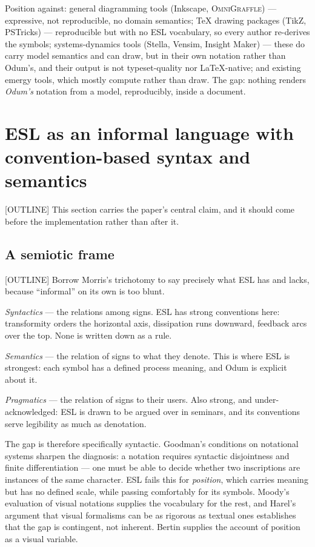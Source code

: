 Position against: general diagramming tools (Inkscape,
\textsc{OmniGraffle}) --- expressive, not reproducible, no domain semantics;
\TeX{} drawing packages (TikZ, PSTricks) --- reproducible but with no ESL
vocabulary, so every author re-derives the symbols; systems-dynamics tools
(Stella, Vensim, Insight Maker) --- these do carry model semantics and can draw,
but in their own notation rather than Odum's, and their output is not
typeset-quality nor \LaTeX-native; and existing emergy tools, which mostly
compute rather than draw. The gap: nothing renders \emph{Odum's} notation from a
model, reproducibly, inside a document.

\section{ESL as an informal language with convention-based syntax and semantics}
\label{sec:informal}

[OUTLINE] This section carries the paper's central claim, and it should come
before the implementation rather than after it.

\subsection{A semiotic frame}
\label{sec:semiotics}

[OUTLINE] Borrow Morris's trichotomy \citep{morris1938} to say precisely what
ESL has and lacks, because ``informal'' on its own is too blunt.

\emph{Syntactics} --- the relations among signs. ESL has strong conventions
here: transformity orders the horizontal axis, dissipation runs downward,
feedback arcs over the top. None is written down as a rule.

\emph{Semantics} --- the relation of signs to what they denote. This is where
ESL is strongest: each symbol has a defined process meaning, and Odum is
explicit about it.

\emph{Pragmatics} --- the relation of signs to their users. Also strong, and
under-acknowledged: ESL is drawn to be argued over in seminars, and its
conventions serve legibility as much as denotation.

The gap is therefore specifically syntactic. Goodman's conditions on notational
systems \citep{goodman1976} sharpen the diagnosis: a notation requires syntactic
disjointness and finite differentiation --- one must be able to decide whether
two inscriptions are instances of the same character. ESL fails this for
\emph{position}, which carries meaning but has no defined scale, while passing
comfortably for its symbols. Moody's evaluation of visual notations
\citep{moody2009} supplies the vocabulary for the rest, and Harel's argument
that visual formalisms can be as rigorous as textual ones \citep{harel1988}
establishes that the gap is contingent, not inherent. Bertin
\citep{bertin1983} supplies the account of position as a visual variable.

